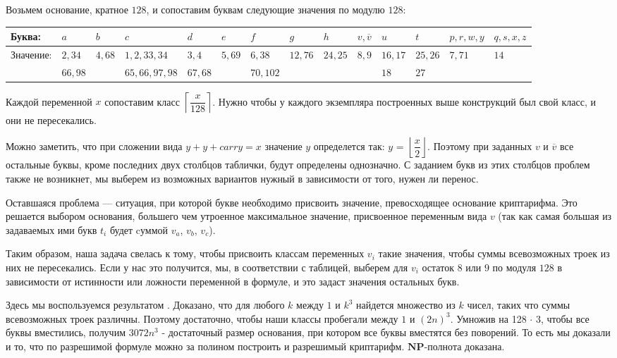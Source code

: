 \documentclass{article}
\begin{document}
Возьмем основание, кратное $128$, и сопоставим буквам следующие значения по модулю $128$:
\vspace{0.1in}
\begin{adjustwidth}{-1in}{-1in}
\begin{center}
\begin{tabular}{|*{14}{l|}}
\hline
Буква: &$a$ & $b$ & $c$ & $d$ & $e$ & $f$ & $g$ & $h$ & $v, \overline{v}$ & $u$ & $t$ & $p, r, w, y$ & $q,s,x,z$  \\
\hline 
Значение: & $2,34$ & $4,68$ & $1,2,33,34$ & $3,4$ & $5,69$ & $6,38$ & $12,76$ & $24,25$ & $8,9$ & $16,17$ & $25,26$ & $7,71$ & $14$ \\
& $66,98$ & & $65,66,97,98$ & $67,68$ & & $70,102$ & & & & $18$ & $27$ & &  \\
\hline 
\end{tabular}
\end{center}
\end{adjustwidth}
\vspace{0.1in}
\noindent Каждой переменной $x$ сопоставим класс $\left \lceil\dfrac{x}{128}\right \rceil $. Нужно чтобы у каждого экземпляра построенных выше конструкций был свой класс, и они не пересекались.

\noindent Можно заметить, что при сложении вида $y+y+carry=x$ значение $y$ определется так: $y$ = $\left \lfloor\dfrac{x}{2}\right \rfloor$. Поэтому при заданных $v$ и $\overline{v}$ все остальные буквы, кроме последних двух столбцов таблички, будут определены однозначно. С заданием букв из этих столбцов проблем также не возникнет, мы выберем из возможных вариантов нужный в зависимости от того, нужен ли перенос.

Оставшаяся проблема --- ситуация, при которой букве необходимо присвоить значение, превосходящее основание криптарифма. Это решается выбором основания, большего чем утроенное максимальное значение, присвоенное переменным вида $v$ (так как самая большая из задаваемых ими букв $t_i$ будет cуммой $v_a$, $v_b$, $v_c$).

Таким образом, наша задача свелась к тому, чтобы присвоить классам переменных $v_i$ такие значения, чтобы суммы всевозможных троек из них не пересекались. Если у нас это получится, мы, в соответствии с таблицей, выберем для $v_i$ остаток $8$ или $9$ по модуля $128$ в зависимости от истинности или ложности переменной в формуле, и это задаст значения остальных букв.

Здесь мы воспользуемся результатом \cite{theory_of_numbers}. Доказано, что для любого $k$ между $1$ и $k^3$ найдется множество из $k$ чисел, таких что суммы всевозможных троек различны. Поэтому достаточно, чтобы наши классы пробегали между $1$ и $(2n)^3$. Умножив на 128 $\cdot$ 3, чтобы все буквы вместились, получим $3072n^3$ - достаточный размер основания, при котором все буквы вместятся без поворений. То есть мы доказали и то, что по разрешимой формуле можно за полином построить и разрешимый криптарифм. $\mathbf{NP}$-полнота доказана.


 
 
\end{document}
